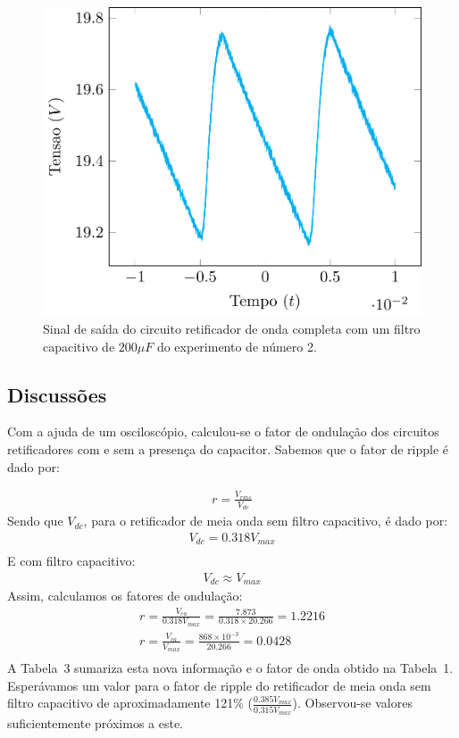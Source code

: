 \documentclass[12pt,a4paper]{article}
\begin{document}
\begin{figure}[H]
  \centering
  \includegraphics[width=0.8\linewidth]{225.pdf}
  \caption{Sinal de saída do circuito retificador de onda completa com um filtro capacitivo de $200\mu F$ do experimento de número 2.}
  \label{fig:226}
\end{figure}

\newpage
\subsection{Discussões}
Com a ajuda de um osciloscópio, calculou-se o fator de ondulação dos circuitos retificadores com e sem a presença do capacitor. Sabemos que o fator de ripple é dado por:

\begin{align}
            \label{eq:ripple1}
  r=\frac{V_{rms}}{V_{dc}} 
\end{align}
Sendo que $V_{dc}$, para o retificador de meia onda sem filtro capacitivo, é dado por:
\begin{align}
            \label{eq:meiaonda}
   V_{dc}  =0.318 V_{max}  \\ 
\end{align}
E com filtro capacitivo:
\begin{align}
            \label{eq:meiaondacapacitor}
   V_{dc}  \approx V_{max}  
\end{align}
Assim, calculamos os fatores de ondulação:
\begin{align}
  r= \frac{V_{ca} }{0.318 V_{max}}= \frac{7.873}{0.318 \times 20.266}= 1.2216 \\
  r= \frac{V_{ca} }{V_{max}}= \frac{868\times10^{-3}}{20.266}= 0.0428\\
\end{align}
A Tabela~3 sumariza esta nova informação e o fator de onda obtido na Tabela~1. Esperávamos um valor para o fator de ripple do retificador de meia onda sem filtro capacitivo de aproximadamente 121\% ($\frac{0.385V_{max}}{0.315V_{max}}$). Observou-se valores suficientemente próximos a este. 
\end{document}
